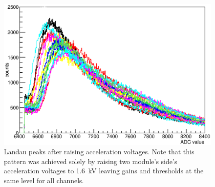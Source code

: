 	\begin{figure}
		\centering
		\includegraphics[width = 0.9 \textwidth]{graphics/setup/LandauPeaksRun1097_new.eps}
		\caption{Landau peaks after raising acceleration voltages. Note that this pattern was achieved solely by raising two module's side's acceleration voltages to \SI{1.6}{\kilo\volt} leaving gains and thresholds at the same level for all channels. }
		\label{fig:allPeaksAfter}
	\end{figure}



